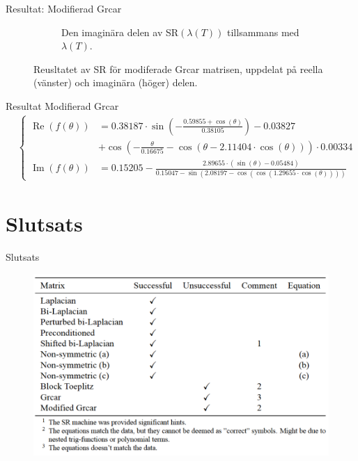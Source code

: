 \documentclass{beamer}
\begin{document}
\begin{frame}{Resultat: Modifierad Grcar}
\begin{figure}[H]
\begin{subfigure}{0.49\textwidth}
        \caption{Den imaginära delen av SR$(\lambda(T))$ tillsammans med $\lambda(T)$.}
        \label{fig:Mres2_im}
    \end{subfigure}
    \caption{Reusltatet av SR för modiferade Grcar matrisen, uppdelat på reella (vänster) och imaginära (höger) delen.}
    \label{fig:Mres2}
    \end{figure}
\end{frame}

\begin{frame}{Resultat Modifierad Grcar}
\begin{align}
    &\begin{cases}
        \operatorname{Re}(f(\theta)) &=  0.38187 \cdot \sin\left( -\frac{0.59855 + \cos(\theta)}{0.38105} \right) - 0.03827\\
        &+  \cos\left( -\frac{\theta}{0.16675} - \cos\left( \theta -  2.11404 \cdot \cos(\theta) \right)  \right) \cdot 0.00334  
        \\
        \operatorname{Im}(f(\theta)) &= 0.15205 - \frac{2.89655 \cdot (\sin(\theta)-0.05484  )}{0.15047 - \sin(2.08197 - \cos(\cos(1.29655 \cdot \cos(\theta))))}
    \end{cases}
\label{eq:mod_g_2}
\end{align}
\end{frame}

\section{Slutsats}

\begin{frame}{Slutsats}
\begin{figure}
    \centering
    \includegraphics[width=0.9\linewidth]{images/BILD_AV_TABELL2.png}
    \caption{}
    \label{fig:enter-label}
\end{figure}
\end{frame}
\end{document}
